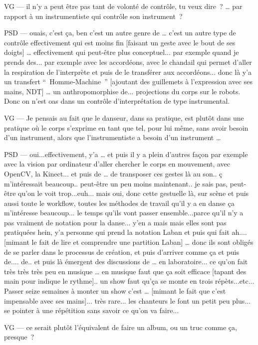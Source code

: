 VG —  il n'y a peut être pas tant de volonté de contrôle, tu veux dire ? … par rapport à un instrumentiste qui contrôle son instrument ? 

PSD — ouais, c'est ça, ben c'est un autre genre de … c'est un autre type de contrôle effectivement qui est moins fin [faisant un geste avec le bout de ses doigts] … effectivement qui peut-être plus conceptuel... par exemple quand je prends des... par exemple avec les accordéons, avec le chandail qui permet d'aller la respiration de l'interprète et puis de le transférer aux accordéons... donc là y'a un transfert “ Homme-Machine ” [ajoutant des guillemets à l'expression avec ses mains, NDT] … un anthropomorphise de... projections du corps sur le robots. Donc on n'est oas dans un contrôle d'interprétation de type instrumental. 

VG —  Je pensais au fait que le danseur, dans sa pratique, est plutôt dans une pratique où le corps s'exprime en tant que tel, pour lui même, sans avoir besoin d'un instrument, alors que l'instrumentiste a besoin d'un instrument … 

PSD — oui...effectivement, y'a … et puis il y a plein d'autres façon par exemple avec la vision par ordinateur d'aller chercher le corps en mouvement, avec OpenCV, la Kinect... et puis de … de transposer ces gestes là au son.. ç m'intéressait beaucoup.. peut-être un peu moins maintenant.. je sais pas, peut-être qu'on le voit trop...euh... mais oui, donc cette gestuelle là, sur scène et puis aussi toute le workflow, toutes les méthodes de travail qu'il y a en danse ça m'intéresse beaucoup... le temps qu'ils vont passer ensemble...parce qu'il n'y a pas vraiment de notation pour la danse... y'en a mais mais elles sont pas pratiquées hein, y'a personne qui prend la notation Laban et puis qui fait ah.... [mimant le fait de lire et comprendre une partition Laban] … donc ils sont obligés de se parler dans le processus de création, et puis d'arriver comme ça et puis de.... de.. et puis là émergent des discussions de … en laboratoire... ce qu'on fait très très très peu en musique … en musique faut que ça soit efficace [tapant des main pour indique le rythme].. un show faut qu'ça se monte en trois répèts...etc... Passer seize semaines à monter un show c'est … [mimant le fait que c'est impensable avec ses mains]... très rare... les chanteurs le font un petit peu plus... se pointer à une répétition sans savoir ce qu'on va faire...  

VG —  ce serait plutôt l'équivalent de faire un album, ou un truc comme ça, presque ? 


